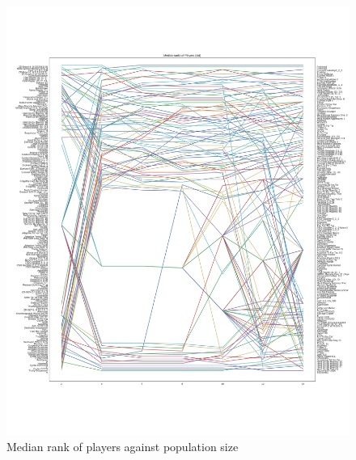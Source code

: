 \documentclass{article}
\begin{document}
\begin{figure}[!hbtp]
    \centering
    \includegraphics[width=\textwidth]{../img/median_rank_vs_population_size_std.pdf}
    \caption{Median rank of players against population size}
    \label{fig:ranks_v_size_standard}
\end{figure}
\end{document}
